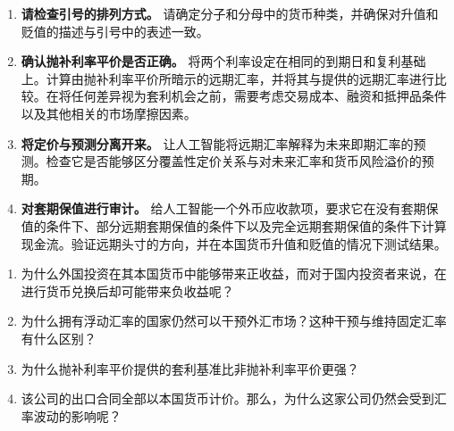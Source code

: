 \begin{enumerate}

\item \textbf{请检查引号的排列方式。} 请确定分子和分母中的货币种类，并确保对升值和贬值的描述与引号中的表述一致。

\item \textbf{确认抛补利率平价是否正确。} 将两个利率设定在相同的到期日和复利基础上。计算由抛补利率平价所暗示的远期汇率，并将其与提供的远期汇率进行比较。在将任何差异视为套利机会之前，需要考虑交易成本、融资和抵押品条件以及其他相关的市场摩擦因素。

\item \textbf{将定价与预测分离开来。} 让人工智能将远期汇率解释为未来即期汇率的预测。检查它是否能够区分覆盖性定价关系与对未来汇率和货币风险溢价的预期。

\item \textbf{对套期保值进行审计。} 给人工智能一个外币应收款项，要求它在没有套期保值的条件下、部分远期套期保值的条件下以及完全远期套期保值的条件下计算现金流。验证远期头寸的方向，并在本国货币升值和贬值的情况下测试结果。

\end{enumerate}




\begin{enumerate}

\item 为什么外国投资在其本国货币中能够带来正收益，而对于国内投资者来说，在进行货币兑换后却可能带来负收益呢？

\item 为什么拥有浮动汇率的国家仍然可以干预外汇市场？这种干预与维持固定汇率有什么区别？

\item 为什么抛补利率平价提供的套利基准比非抛补利率平价更强？

\item 该公司的出口合同全部以本国货币计价。那么，为什么这家公司仍然会受到汇率波动的影响呢？

\end{enumerate}




